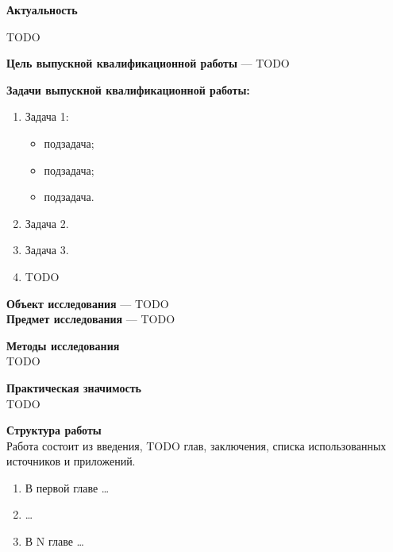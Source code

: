 \textbf{Актуальность}

TODO

\textbf{Цель выпускной квалификационной работы} — TODO

\textbf{Задачи выпускной квалификационной работы:}
\begin{enumerate}
\item Задача 1:
    \begin{itemize}
    \item подзадача;
    \item подзадача;
    \item подзадача.
    \end{itemize}
\item Задача 2.
\item Задача 3.
\item TODO
\end{enumerate}

\textbf{Объект исследования} — TODO\\
\textbf{Предмет исследования} — TODO

\textbf{Методы исследования}\\
TODO

\textbf{Практическая значимость}\\
TODO

\textbf{Структура работы}\\
Работа состоит из введения, TODO глав, заключения, списка использованных источников и приложений.
\begin{enumerate}
    \item В первой главе \ldots
    \item \ldots
    \item В N главе \ldots
\end{enumerate}
